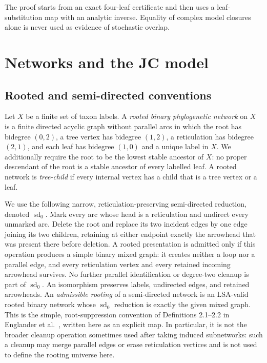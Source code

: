 \documentclass[11pt]{article}
\theoremstyle{remark}
\begin{document}
The proof starts from an exact four-leaf certificate and then uses a
leaf-substitution map with an analytic inverse.  Equality of complex model
closures alone is never used as evidence of stochastic overlap.

\section{Networks and the JC model}

\subsection{Rooted and semi-directed conventions}

Let $X$ be a finite set of taxon labels.  A \emph{rooted binary
phylogenetic network} on $X$ is a finite directed acyclic graph without
parallel arcs in which the root has bidegree $(0,2)$, a tree vertex has
bidegree $(1,2)$, a reticulation has bidegree $(2,1)$, and each leaf has
bidegree $(1,0)$ and a unique label in $X$.  We additionally require the
root to be the lowest stable ancestor of $X$: no proper descendant of the
root is a stable ancestor of every labelled leaf.  A rooted network is
\emph{tree-child} if every internal vertex has a child that is a tree vertex
or a leaf.

We use the following narrow, reticulation-preserving semi-directed reduction,
denoted $\operatorname{sd}_0$.  Mark every arc whose head is a
reticulation and undirect every unmarked arc.  Delete the root and replace its
two incident edges by one edge joining its two children, retaining at either
endpoint exactly the arrowhead that was present there before deletion.  A
rooted presentation is admitted only if this operation produces a simple
binary mixed graph: it creates neither a loop nor a parallel edge, and every
reticulation vertex and every retained incoming arrowhead survives.  No
further parallel identification or degree-two cleanup is part of
$\operatorname{sd}_0$.  An isomorphism preserves labels, undirected edges,
and retained arrowheads.  An \emph{admissible rooting} of a semi-directed
network is an LSA-valid rooted binary network whose $\operatorname{sd}_0$
reduction is exactly the given mixed graph.
This is the simple, root-suppression convention of Definitions 2.1--2.2 in
Englander et al.~\cite{EnglanderEtAl2026}, written here as an explicit map.
In particular, it is not the broader cleanup operation sometimes used after
taking induced subnetworks: such a cleanup may merge parallel edges or erase
reticulation vertices and is not used to define the rooting universe here.
\end{document}
